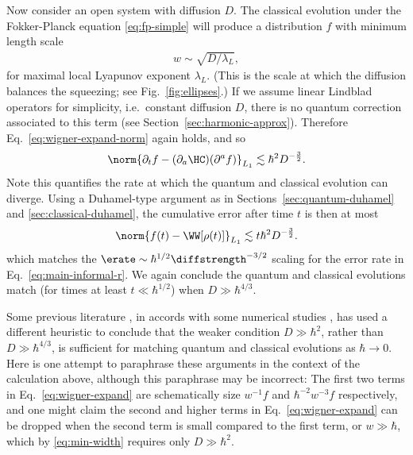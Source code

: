 \documentclass{article}
\numberwithin{equation}{section}
\begin{document}
Now consider an open system with diffusion $D$. The classical evolution under the Fokker-Planck equation \eqref{eq:fp-simple} will produce a distribution $f$ with minimum length scale 
\begin{align} \label{eq:min-width}
    w \sim \sqrt{D/\lambda_L},
\end{align}
for maximal local Lyapunov exponent $\lambda_L$.  (This is the scale at which the diffusion balances the squeezing; see Fig.~\ref{fig:ellipses}.) If we assume linear Lindblad operators for simplicity, i.e.\ constant diffusion $D$, there is no quantum correction associated to this term (see Section~\ref{sec:harmonic-approx}). Therefore Eq.~\eqref{eq:wigner-expand-norm} again holds, and
so
\begin{align}
    \norm{\partial_t f - (\partial_a \HC)(\partial^a f)}_{L_1} \lesssim \hbar^2 D^{-\frac32}.
\end{align}
Note this quantifies the rate at which the quantum and classical evolution can diverge.  Using a Duhamel-type argument as in Sections~\ref{sec:quantum-duhamel} and \ref{sec:classical-duhamel}, the cumulative error after time $t$ is then at most
\begin{align}
    \norm{f(t) - \WW[\rho(t)]}_{L_1} \lesssim t \hbar^2 D^{-\frac32}.
\end{align}
which matches the $\erate \sim \hbar^{1/2}\diffstrength^{-3/2}$ scaling for the error rate in Eq.~\eqref{eq:main-informal-r}.  We again conclude the quantum and classical evolutions match (for times at least $t \ll \hbar^{1/2}$) when $D \gg \hbar^{4/3}$.

Some previous literature \cite{kolovsky1994remark, zurek2003decoherence}, in accords with some numerical studies \cite{pattanayak2003parameter, gammal2007quantum}, has used a different heuristic to conclude that the weaker condition $D \gg \hbar^2$, rather than $D \gg \hbar^{4/3}$, is sufficient for matching quantum and classical evolutions as $\hbar \to 0$.
Here is one attempt to paraphrase these arguments in the context of the calculation above, although this paraphrase may be incorrect: 
The first two terms in Eq.~\eqref{eq:wigner-expand} are schematically size $w^{-1} f$ and $\hbar^{-2} w^{-3} f$ respectively, and one might claim the second and higher terms in Eq.~\eqref{eq:wigner-expand} can be dropped when the second term is small compared to the first term, or $w \gg \hbar$, which by \eqref{eq:min-width} requires only $D \gg \hbar^2$.  
\end{document}
